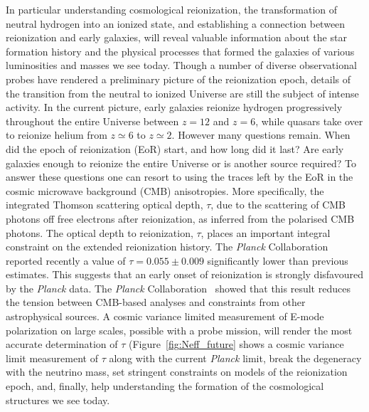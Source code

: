 In particular understanding cosmological reionization, the transformation of neutral
hydrogen into an ionized state, and establishing a connection between reionization and early galaxies, will 
reveal valuable information about the star formation history and the physical processes that formed the galaxies of various luminosities and masses we see today. 
 Though a number of diverse observational probes have rendered a preliminary picture of the reionization epoch, details of the transition from the neutral to ionized 
 Universe are still the subject of intense activity. 
In the current picture, early galaxies reionize hydrogen progressively throughout the entire Universe between $z = 12$ and $z  = 6$,
while quasars take over to reionize helium from $z \simeq 6$ to $z \simeq 2$. However many questions remain. When did the epoch of reionization
(EoR) start, and how long did it last? Are early galaxies enough to reionize the entire Universe or is another source required?
To answer these questions one can resort to using the traces left by the EoR in the cosmic microwave background (CMB) anisotropies.
More specifically, the integrated Thomson scattering optical depth, $\tau$, due to the scattering of CMB photons off free electrons after reionization, 
as inferred from the polarised CMB photons. 
The optical depth to reionization, $\tau$, places an important integral constraint on the extended reionization history.
The {\it Planck} Collaboration~\cite{planck2015-XLVI,planck2015-XXXI} reported recently a value of $\tau=0.055 \pm 0.009$ significantly lower than previous estimates. 
This suggests that an early onset of reionization is strongly disfavoured by the {\it Planck} data. 
The {\it Planck} Collaboration~\cite{planck2015-XXXI} showed that this result reduces the tension between CMB-based analyses and constraints from 
other astrophysical sources. 
A cosmic variance limited measurement of E-mode polarization on large scales, possible with a probe mission, will render the most accurate 
determination of $\tau$ (Figure~\ref{fig:Neff_future}
shows a cosmic variance limit measurement of $\tau$ along with the current {\it Planck} limit, break the degeneracy with the neutrino mass, 
set stringent constraints on models of the reionization epoch, and, finally, help understanding the formation of the cosmological structures we see today.


